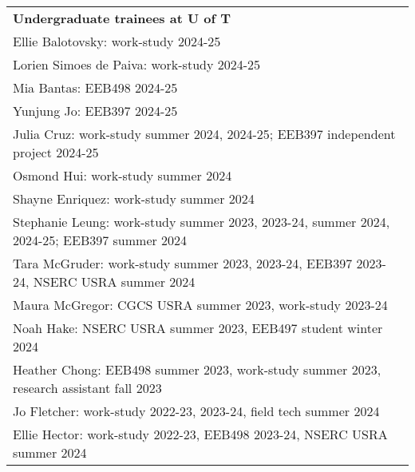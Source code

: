 \documentclass[letterpaper,11pt,oneside]{article}
\begin{document}
\noindent \begin{tabular}{@{} >{\raggedright\arraybackslash}p{17.0cm}}

 \textbf{Undergraduate trainees at U of T} \\
 Ellie Balotovsky: work-study 2024-25 \\
 Lorien Simoes de Paiva: work-study 2024-25 \\
Mia Bantas: EEB498 2024-25 \\
Yunjung Jo: EEB397 2024-25 \\
Julia Cruz: work-study summer 2024, 2024-25; EEB397 independent project 2024-25 \\
Osmond Hui: work-study summer 2024 \\
Shayne Enriquez: work-study summer 2024 \\
Stephanie Leung: work-study summer 2023, 2023-24, summer 2024, 2024-25; EEB397 summer 2024  \\
Tara McGruder: work-study summer 2023, 2023-24, EEB397 2023-24, NSERC USRA summer 2024 \\
Maura McGregor: CGCS USRA summer 2023, work-study 2023-24 \\
Noah Hake: NSERC USRA summer 2023, EEB497 student winter 2024 \\
Heather Chong: EEB498 summer 2023, work-study summer 2023, research assistant fall 2023  \\
Jo Fletcher: work-study 2022-23, 2023-24, field tech summer 2024 \\
Ellie Hector: work-study 2022-23, EEB498 2023-24, NSERC USRA summer 2024 \\
\end{tabular}
\end{document}

